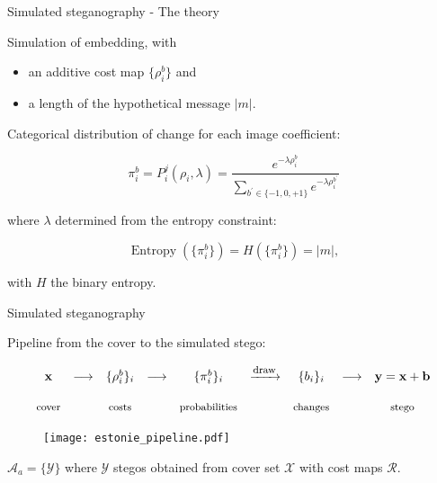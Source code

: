 \documentclass[10pt,aspectratio=169]{beamer}
\begin{document}
\begin{frame}{Simulated steganography - The theory}

    Simulation of embedding, with
    \begin{itemize}
        \item an additive cost map $\{\rho_i^b\}$ and 
        \item a length of the hypothetical message $|m|$. 
    \end{itemize}

    \pause 
    Categorical distribution of change for each image coefficient:

    \begin{equation}
        \pi_{i}^b = P_i^j\left(\rho_{i}, \lambda\right) = \frac{e^{-\lambda \rho_{i}^{b}}}{\sum_{b^{\prime} \in \{-1,0,+1\}} e^{-\lambda \rho_{i}^{b^{\prime}}}}
    \end{equation}

    \pause
    where $\lambda$ determined from the entropy constraint:

    \begin{equation}
        \operatorname{Entropy}(\{\pi_i^b\}) = H(\{\pi_i^b\}) = |m|,
    \end{equation}

    with $H$ the binary entropy.

\end{frame}


\begin{frame}{Simulated steganography}

    Pipeline from the cover to the simulated stego:

    \begin{equation*}
        \begin{array}{ccccccccc}
            \mathbf{x} & \longrightarrow & \{\rho^b_i\}_i & \longrightarrow & \{\pi_i^b\}_i &   \xrightarrow{\mbox{\footnotesize{draw}}} & \{b_i\}_i &  \longrightarrow & \mathbf{y} = \mathbf{x} + \mathbf{b} \\ \\
            \mbox{\footnotesize{cover}} & & \mbox{\footnotesize{costs}} & & \mbox{\footnotesize{probabilities}} & & \mbox{\footnotesize{changes}} & &  \mbox{\footnotesize{stego}}
        \end{array}
    \end{equation*}

    \begin{figure}[h]
        \centerline{\texttt{[image: estonie\_pipeline.pdf]}}
    \end{figure}

    \pause
    $\mathcal{A}_a = \{\mathcal{Y}\}$ where $\mathcal{Y}$ stegos obtained from cover set $\mathcal{X}$ with cost maps $\mathcal{R}$.

\end{frame}
\end{document}
